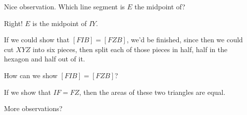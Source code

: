 Nice observation. Which line segment is $E$ the midpoint of?









Right! $E$ is the midpoint of $IY$.



If we could show that $[FIB] = [FZB]$, we'd be finished, since then we could cut $XYZ$ into six pieces, then split each of those pieces in half, half in the hexagon and half out of it.

How can we show $[FIB] = [FZB]$?





If we show that $IF = FZ$, then the areas of these two triangles are equal.

More observations?

